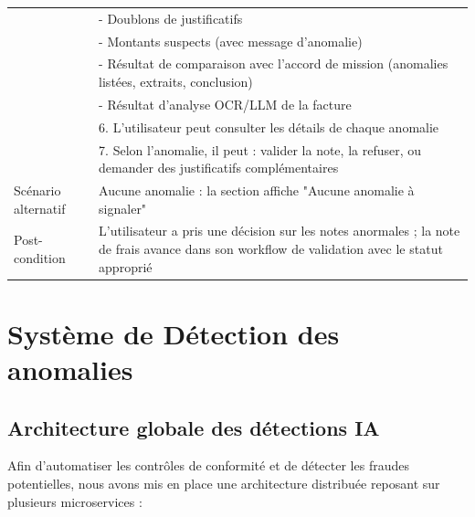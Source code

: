 \documentclass[12pt,a4paper]{report}
\begin{document}
\begin{longtable}{|p{3cm}|p{11cm}|}
& \hspace{0.5cm} - Doublons de justificatifs \\

& \hspace{0.5cm} - Montants suspects (avec message d'anomalie) \\

& \hspace{0.5cm} - Résultat de comparaison avec l'accord de mission (anomalies listées, extraits, conclusion) \\

& \hspace{0.5cm} - Résultat d'analyse OCR/LLM de la facture \\

& 6. L'utilisateur peut consulter les détails de chaque anomalie \\

& 7. Selon l'anomalie, il peut : valider la note, la refuser, ou demander des justificatifs complémentaires \\

\hline

Scénario alternatif & Aucune anomalie : la section affiche "Aucune anomalie à signaler" \\

\hline

Post-condition & L'utilisateur a pris une décision sur les notes anormales ; la note de frais avance dans son workflow de validation avec le statut approprié \\



\end{longtable}



\section{Système de Détection des anomalies}



\subsection{Architecture globale des détections IA}

Afin d'automatiser les contrôles de conformité et de détecter les fraudes potentielles, nous avons mis en place une architecture distribuée reposant sur plusieurs microservices :
\end{document}
